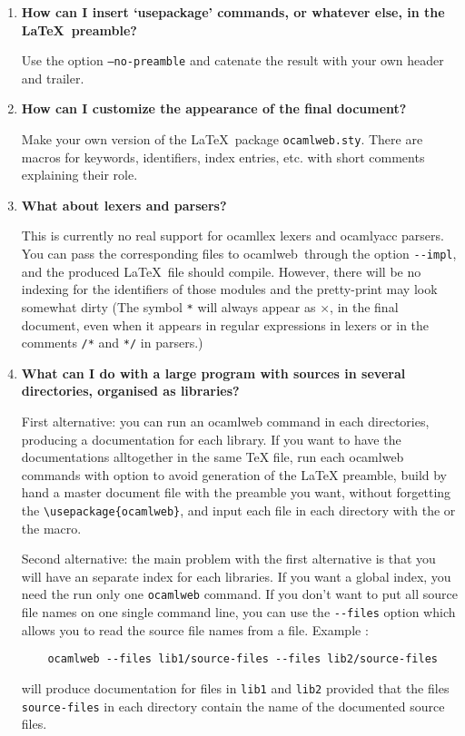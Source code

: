 \documentclass[12pt]{article}
\newcommand{\ocamlweb}{\textsf{ocamlweb}}
\begin{document}
\begin{enumerate}
\item \textbf{How can I insert `usepackage' commands, or whatever else,
  in the \LaTeX\ preamble?} ~\par

  Use the option \texttt{--no-preamble} and catenate the result with your
  own header and trailer.

\item \textbf{How can I customize the appearance of the final
    document?} ~\par 

  Make your own version of the \LaTeX\ package
  \texttt{ocamlweb.sty}. There are macros for keywords, identifiers,
  index entries, etc. with short comments explaining their role.

\item \textbf{What about lexers and parsers?} ~\par

  This is currently no real support for \textsf{ocamllex} lexers and
  \textsf{ocamlyacc} parsers. You can pass the corresponding files to
  \ocamlweb\ through the option \verb!--impl!, and the produced
  \LaTeX\ file should compile. However, there will be no indexing for
  the identifiers of those modules and the pretty-print may look
  somewhat dirty (The symbol \verb!*! will always appear as $\times$,
  in the final document, even when it appears in regular expressions
  in lexers or in the comments \verb!/*! and \verb!*/! in parsers.)

\item \textbf{What can I do with a large program with sources in several
    directories, organised as libraries?} ~

  First alternative: you can run an ocamlweb command in each
  directories, producing a documentation for each library. If you want
  to have the documentations alltogether in the same TeX file, run
  each ocamlweb commands with option  to avoid
  generation of the LaTeX preamble, build by hand a master document
  file with the preamble you want, without forgetting the
  \verb|\usepackage{ocamlweb}|, and input each file in each directory
  with the \verb|| or the \verb|| macro.
  
  Second alternative: the main problem with the first alternative is
  that you will have an separate index for each libraries. If you want
  a global index, you need the run only one \verb|ocamlweb| command.
  If you don't want to put all source file names on one single command
  line, you can use the \verb|--files| option which allows you to read
  the source file names from a file. Example :
\begin{verbatim}
    ocamlweb --files lib1/source-files --files lib2/source-files
\end{verbatim}
  will produce documentation for files in \verb|lib1| and \verb|lib2|
  provided that the files \verb|source-files| in each directory
  contain the name of the documented source files.

\end{enumerate}



\end{document}
